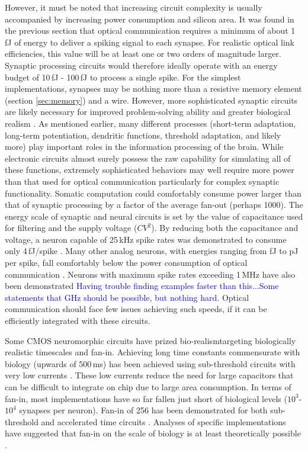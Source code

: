 \documentclass[twocolumn]{article}
\begin{document}
However, it must be noted that increasing circuit complexity is usually accompanied by increasing power consumption and silicon area. It was found in the previous section that optical communication requires a minimum of about 1\,fJ of energy to deliver a spiking signal to each synapse. For realistic optical link efficiencies, this value will be at least one or two orders of magnitude larger. Synaptic processing circuits would therefore ideally operate with an energy budget of 10\,fJ - 100\,fJ to process a single spike. For the simplest implementations, synapses may be nothing more than a resistive memory element (section \ref{sec:memory}) and a wire. However, more sophisticated synaptic circuits are likely necessary for improved problem-solving ability and greater biological realism \cite{chicca2020recipe}. As mentioned earlier, many different processes (short-term adaptation, long-term potentiation, dendritic functions, threshold adaptation, and likely more) play important roles in the information processing of the brain. While electronic circuits almost surely possess the raw capability for simulating all of these functions, extremely sophisticated behaviors may well require more power than that used for optical communication \textemdash particularly for complex synaptic functionality. Somatic computation could comfortably consume power larger than that of synaptic processing by a factor of the average fan-out (perhaps 1000). The energy scale of synaptic and neural circuits is set by the value of capacitance used for filtering and the supply voltage ($CV^{2}$). By reducing both the capacitance and voltage, a neuron capable of 25\,kHz spike rates was demonstrated to consume only 4\,fJ/spike \cite{sourikopoulos20174}. Many other analog neurons, with energies ranging from fJ to pJ per spike, fall comfortably below the power consumption of optical communication \cite{indiveri2019importance}. Neurons with maximum spike rates exceeding 1\,MHz have also been demonstrated \textcolor{blue}{Having trouble finding examples faster than this...Some statements that GHz should be possible, but nothing hard}. Optical communication should face few issues achieving such speeds, if it can be efficiently integrated with these circuits.

Some CMOS neuromorphic circuits have prized bio-realism\textemdash targeting biologically realistic timescales and fan-in. Achieving long time constants commensurate with biology (upwards of 500\,ms) has been achieved using sub-threshold circuits with very low currents \cite{indiveri2011neuromorphic}. These low currents reduce the need for large capacitors that can be difficult to integrate on chip due to large area consumption. In terms of fan-in, most implementations have so far fallen just short of biological levels ($10^3$-$10^4$ synapses per neuron). Fan-in of 256 has been demonstrated for both sub-threshold \cite{qiao2015reconfigurable} and accelerated time circuits \cite{schemmel2020accelerated}. Analyses of specific implementations have suggested that fan-in on the scale of biology is at least theoretically possible \cite{dowrick2018fan, akima2014majority}.  
\end{document}
